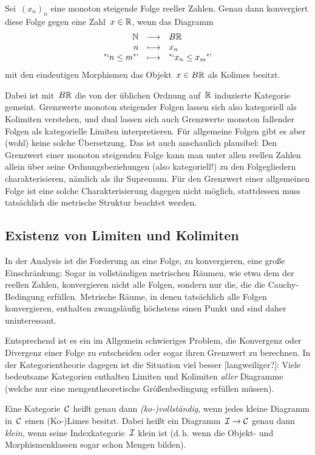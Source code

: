 \begin{prop}Sei~$(x_n)_n$ eine monoton steigende Folge reeller Zahlen. Genau dann
konvergiert diese Folge gegen eine Zahl~$x \in \mathbb{R}$, wenn das Diagramm
\[ \begin{array}{@{}rcl@{}}
  \NN &\longrightarrow& B\RR \\
  n &\longmapsto& x_n \\
  \text{"`$n \leq m$"'} &\longmapsto& \text{"`$x_n \leq x_m$"'}
\end{array} \]
mit den eindeutigen Morphismen das Objekt~$x \in B\mathbb{R}$ als Kolimes besitzt.
\end{prop}
Dabei ist mit~$B\mathbb{R}$ die von der üblichen Ordnung auf~$\mathbb{R}$ induzierte
Kategorie gemeint. Grenzwerte monoton steigender Folgen lassen sich also
kategoriell als Kolimiten verstehen, und dual lassen sich auch Grenzwerte
monoton fallender Folgen als kategorielle Limiten interpretieren. Für
allgemeine Folgen gibt es aber (wohl) keine solche Übersetzung. Das ist auch
anschaulich plausibel: Den Grenzwert einer monoton steigenden Folge kann man
unter allen reellen Zahlen allein über seine Ordnungsbeziehungen (also kategoriell!) zu
den Folgegliedern charakterisieren, nämlich als ihr Supremum. Für den Grenzwert
einer allgemeinen Folge ist eine solche Charakterisierung dagegen nicht
möglich, stattdessen muss tatsächlich die metrische Struktur beachtet werden.


\subsection{Existenz von Limiten und Kolimiten}

In der Analysis ist die Forderung an eine Folge, zu konvergieren, eine große
Einschränkung: Sogar in vollständigen metrischen Räumen, wie etwa dem der
reellen Zahlen, konvergieren nicht alle Folgen, sondern nur die, die die
Cauchy-Bedingung erfüllen. Metrische Räume, in denen tatsächlich alle Folgen
konvergieren, enthalten zwangsläufig höchstens einen Punkt und sind daher
uninteressant.

Entsprechend ist es ein im Allgemein schwieriges Problem, die Konvergenz oder
Divergenz einer Folge zu entscheiden oder sogar ihren Grenzwert zu berechnen.
In der Kategorientheorie dagegen ist die Situation viel besser [langweiliger?]: Viele
bedeutsame Kategorien enthalten Limiten und Kolimiten \emph{aller} Diagramme
(welche nur eine mengentheoretische Größenbedingung erfüllen müssen).

\begin{defn}Eine Kategorie~$\mathcal{C}$ heißt genau dann \emph{(ko-)vollständig}, wenn
jedes kleine Diagramm in~$\mathcal{C}$ einen (Ko-)Limes besitzt. Dabei heißt ein
Diagramm~$\mathcal{I} \to \mathcal{C}$ genau dann \emph{klein}, wenn seine Indexkategorie~$\mathcal{I}$
klein ist (d.\,h. wenn die Objekt- und Morphismenklassen sogar schon Mengen
bilden).\end{defn}

